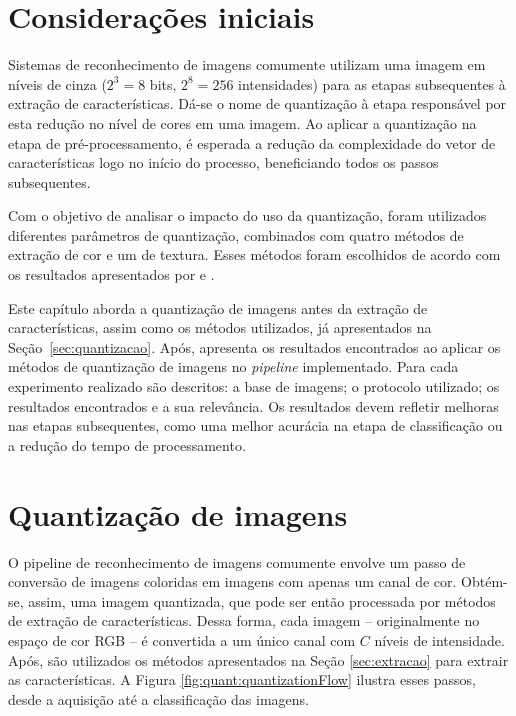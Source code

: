 \section{Considerações iniciais}

Sistemas de reconhecimento de imagens comumente utilizam uma imagem em níveis de cinza ($2^3 = 8$ bits, $2^8 = 256$ intensidades) para as etapas subsequentes à extração de características. Dá-se o nome de quantização à etapa responsável por esta redução no nível de cores em uma imagem. Ao aplicar a quantização na etapa de pré-processamento, é esperada a redução da complexidade do vetor de características logo no início do processo, beneficiando todos os passos subsequentes.

Com o objetivo de analisar o impacto do uso da quantização, foram utilizados diferentes parâmetros de quantização, combinados com quatro métodos de extração de cor e um de textura. Esses métodos foram escolhidos de acordo com os resultados apresentados por  e .

Este capítulo aborda a quantização de imagens antes da extração de características, assim como os métodos utilizados, já apresentados na Seção~\ref{sec:quantizacao}. Após, apresenta os resultados encontrados ao aplicar os métodos de quantização de imagens no \textit{pipeline} implementado. Para cada experimento realizado são descritos: a base de imagens; o protocolo utilizado; os resultados encontrados e a sua relevância.
Os resultados devem refletir melhoras nas etapas subsequentes, como uma melhor acurácia na etapa de classificação ou a redução do tempo de processamento.

\section{Quantização de imagens}

O pipeline de reconhecimento de imagens comumente envolve um passo de conversão de imagens coloridas em imagens com apenas um canal de cor. Obtém-se, assim, uma imagem quantizada, que pode ser então processada por métodos de extração de características. Dessa forma, cada imagem -- originalmente no espaço de cor RGB -- é convertida a um único canal com $C$ níveis de intensidade. Após, são utilizados os métodos apresentados na Seção \ref{sec:extracao} para extrair as características. A Figura \ref{fig:quant:quantizationFlow} ilustra esses passos, desde a aquisição até a classificação das imagens.

